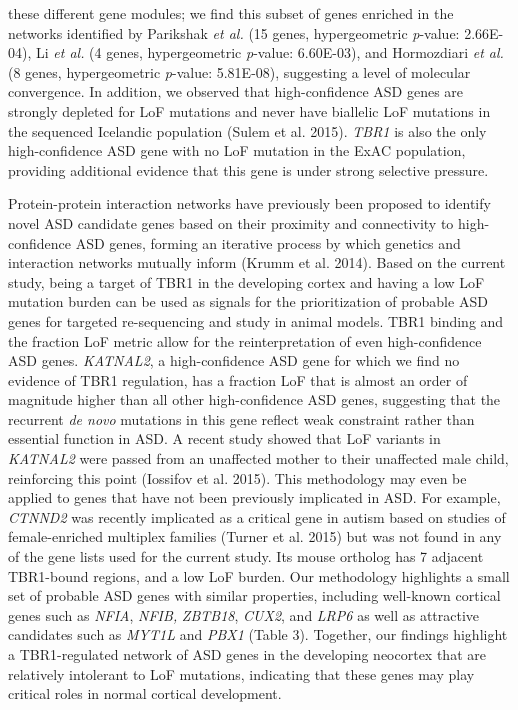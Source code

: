 \documentclass[]{article}
\begin{document}
these different gene modules; we find this subset of genes enriched in
the networks identified by Parikshak \emph{et al.} (15 genes,
hypergeometric \emph{p}-value: 2.66E-04), Li \emph{et al.} (4 genes,
hypergeometric \emph{p}-value: 6.60E-03), and Hormozdiari \emph{et al.}
(8 genes, hypergeometric \emph{p}-value: 5.81E-08), suggesting a level
of molecular convergence. In addition, we observed that high-confidence
ASD genes are strongly depleted for LoF mutations and never have
biallelic LoF mutations in the sequenced Icelandic population (Sulem et
al. 2015). \emph{TBR1} is also the only high-confidence ASD gene with no
LoF mutation in the ExAC population, providing additional evidence that
this gene is under strong selective pressure.

Protein-protein interaction networks have previously been proposed to
identify novel ASD candidate genes based on their proximity and
connectivity to high-confidence ASD genes, forming an iterative process
by which genetics and interaction networks mutually inform (Krumm et al.
2014). Based on the current study, being a target of TBR1 in the
developing cortex and having a low LoF mutation burden can be used as
signals for the prioritization of probable ASD genes for targeted
re-sequencing and study in animal models. TBR1 binding and the fraction
LoF metric allow for the reinterpretation of even high-confidence ASD
genes. \emph{KATNAL2}, a high-confidence ASD gene for which we find no
evidence of TBR1 regulation, has a fraction LoF that is almost an order
of magnitude higher than all other high-confidence ASD genes, suggesting
that the recurrent \emph{de novo} mutations in this gene reflect weak
constraint rather than essential function in ASD. A recent study showed
that LoF variants in \emph{KATNAL2} were passed from an unaffected
mother to their unaffected male child, reinforcing this point (Iossifov
et al. 2015). This methodology may even be applied to genes that have
not been previously implicated in ASD. For example, \emph{CTNND2} was
recently implicated as a critical gene in autism based on studies of
female-enriched multiplex families (Turner et al. 2015) but was not
found in any of the gene lists used for the current study. Its mouse
ortholog has 7 adjacent TBR1-bound regions, and a low LoF burden. Our
methodology highlights a small set of probable ASD genes with similar
properties, including well-known cortical genes such as \emph{NFIA},
\emph{NFIB,} \emph{ZBTB18}, \emph{CUX2}, and \emph{LRP6} as well as
attractive candidates such as \emph{MYT1L} and \emph{PBX1} (Table 3).
Together, our findings highlight a TBR1-regulated network of ASD genes
in the developing neocortex that are relatively intolerant to LoF
mutations, indicating that these genes may play critical roles in normal
cortical development.
\end{document}
